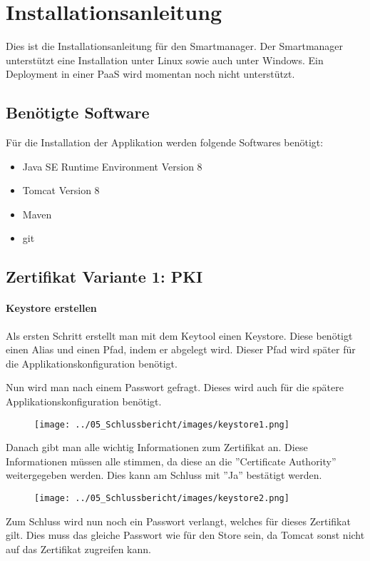 \chapter{Installationsanleitung}
\label{sec:installation}
Dies ist die Installationsanleitung für den Smartmanager. Der Smartmanager unterstützt eine Installation unter Linux sowie auch unter Windows. Ein Deployment in einer PaaS wird momentan noch nicht unterstützt. 
\section{Benötigte Software}
Für die Installation der Applikation werden folgende Softwares benötigt:
\begin{itemize}
\item Java SE Runtime Environment Version 8
\item Tomcat Version 8
\item Maven
\item git
\end{itemize}
\section{Zertifikat Variante 1: PKI}
\subsubsection{Keystore erstellen}
Als ersten Schritt erstellt man mit dem Keytool einen Keystore. Diese benötigt einen Alias und einen Pfad, indem er abgelegt wird. Dieser Pfad wird später für die Applikationskonfiguration benötigt.
  
Nun wird man nach einem Passwort gefragt. Dieses wird auch für die spätere Applikationskonfiguration benötigt.
\begin{figure}[H]
\centering
\texttt{[image: ../05\_Schlussbericht/images/keystore1.png]}
\end{figure}
\newpage

Danach gibt man alle wichtig Informationen zum Zertifikat an. Diese Informationen müssen alle stimmen, da diese an die ''Certificate Authority'' weitergegeben werden. Dies kann am Schluss mit ''Ja'' bestätigt werden.
\begin{figure}[H]
\centering
\texttt{[image: ../05\_Schlussbericht/images/keystore2.png]}
\end{figure}

Zum Schluss wird nun noch ein Passwort verlangt, welches für dieses Zertifikat gilt. Dies muss das gleiche Passwort wie für den Store sein, da Tomcat sonst nicht auf das Zertifikat zugreifen kann.

